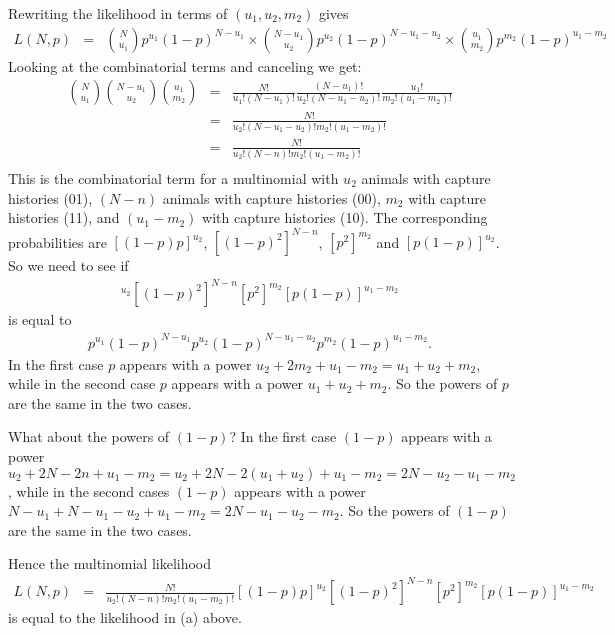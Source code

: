 \begin{questions}
\begin{parts}
{\begin{solution}
Rewriting the likelihood in terms of $(u_1, u_2, m_2)$ gives
\begin{eqnarray*}
L(N,p)&=&{N\choose u_1}p^{u_1}(1-p)^{N-u_1}\times
{N-u_1\choose u_2}p^{u_2}(1-p)^{N-u_1-u_2}\times
{u_1\choose m_2}p^{m_2}(1-p)^{u_1-m_2}
\end{eqnarray*}
\noindent
Looking at the combinatorial terms and canceling we get:
\begin{eqnarray*}
{N\choose u_1}{N-u_1\choose u_2}{u_1\choose m_2}
&=&\frac{N!}{u_1!(N-u_1)!}\frac{(N-u_1)!}{u_2!(N-u_1-u_2)!}\frac{u_1!}{m_2!(u_1-m_2)!} \\
&=&\frac{N!}{u_2!(N-u_1-u_2)!m_2!(u_1-m_2)!} \\
&=&\frac{N!}{u_2!(N-n)!m_2!(u_1-m_2)!} \\
\end{eqnarray*}
\noindent
This is the combinatorial term for a multinomial with $u_2$ animals with capture histories (01), $(N-n)$ animals with capture histories (00), $m_2$ with capture histories (11), and $(u_1-m_2)$ with capture histories (10). The corresponding probabilities are $[(1-p)p]^{u_2}$, $[(1-p)^2]^{N-n}$, $[p^2]^{m_2}$ and $[p(1-p)]^{u_2}$. So we need to see if
\begin{eqnarray*}
[(1-p)p]^{u_2}[(1-p)^2]^{N-n}[p^2]^{m_2}[p(1-p)]^{u_1-m_2}
\end{eqnarray*}
\noindent
is equal to
\begin{eqnarray*}
p^{u_1}(1-p)^{N-u_1}p^{u_2}(1-p)^{N-u_1-u_2}p^{m_2}(1-p)^{u_1-m_2}.
\end{eqnarray*}
\noindent
In the first case $p$ appears with a power $u_2+2m_2+u_1-m_2=u_1+u_2+m_2$, while in the second case $p$ appears with a power $u_1+u_2+m_2$. So the powers of $p$ are the same in the two cases. 

What about the powers of $(1-p)$? In the first case $(1-p)$ appears with a power $u_2+2N-2n+u_1-m_2=u_2+2N-2(u_1+u_2)+u_1-m_2=2N-u_2-u_1-m_2$, while in the second cases $(1-p)$ appears with a power $N-u_1+N-u_1-u_2+u_1-m_2=2N-u_1-u_2-m_2$. So the powers of $(1-p)$ are the same in the two cases.

Hence the multinomial likelihood
\begin{eqnarray*}
L(N,p)&=&\frac{N!}{u_2!(N-n)!m_2!(u_1-m_2)!}[(1-p)p]^{u_2}[(1-p)^2]^{N-n}[p^2]^{m_2}[p(1-p)]^{u_1-m_2}
\end{eqnarray*}
\noindent
is equal to the likelihood in (a) above.
\end{solution}}


\end{parts}
\end{questions}

